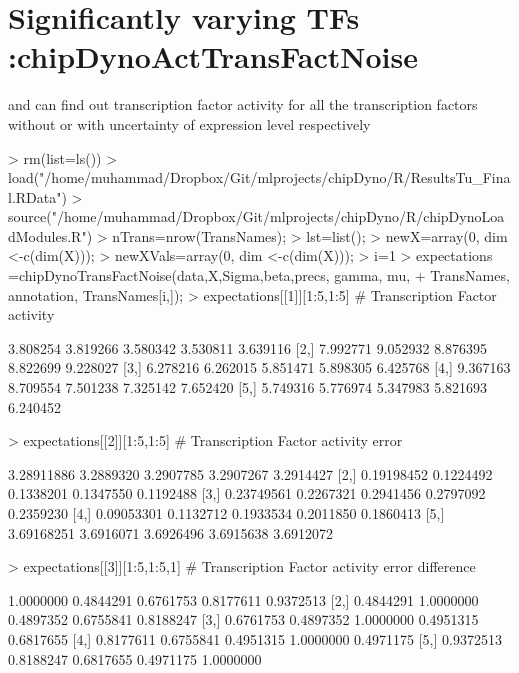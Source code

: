 \documentclass{article}
\begin{document}
\section{Significantly varying TFs :chipDynoActTransFactNoise}
 and  can find out transcription factor activity for all the transcription factors without or with uncertainty of expression level respectively 



\begin{Schunk}
\begin{Sinput}
> rm(list=ls())
> load("/home/muhammad/Dropbox/Git/mlprojects/chipDyno/R/ResultsTu_Final.RData")
> source("/home/muhammad/Dropbox/Git/mlprojects/chipDyno/R/chipDynoLoadModules.R")
> nTrans=nrow(TransNames);
> lst=list();
> newX=array(0, dim <-c(dim(X)));
> newXVals=array(0, dim <-c(dim(X)));
> i=1
> expectations =chipDynoTransFactNoise(data,X,Sigma,beta,precs, gamma, mu, 
+   					TransNames, annotation, TransNames[i,]);
> expectations[[1]][1:5,1:5] # Transcription Factor activity
\end{Sinput}
\begin{Soutput}
         [,1]     [,2]     [,3]     [,4]     [,5]
[1,] 3.808254 3.819266 3.580342 3.530811 3.639116
[2,] 7.992771 9.052932 8.876395 8.822699 9.228027
[3,] 6.278216 6.262015 5.851471 5.898305 6.425768
[4,] 9.367163 8.709554 7.501238 7.325142 7.652420
[5,] 5.749316 5.776974 5.347983 5.821693 6.240452
\end{Soutput}
\begin{Sinput}
> expectations[[2]][1:5,1:5] # Transcription Factor activity error
\end{Sinput}
\begin{Soutput}
           [,1]      [,2]      [,3]      [,4]      [,5]
[1,] 3.28911886 3.2889320 3.2907785 3.2907267 3.2914427
[2,] 0.19198452 0.1224492 0.1338201 0.1347550 0.1192488
[3,] 0.23749561 0.2267321 0.2941456 0.2797092 0.2359230
[4,] 0.09053301 0.1132712 0.1933534 0.2011850 0.1860413
[5,] 3.69168251 3.6916071 3.6926496 3.6915638 3.6912072
\end{Soutput}
\begin{Sinput}
> expectations[[3]][1:5,1:5,1] # Transcription Factor activity error difference
\end{Sinput}
\begin{Soutput}
          [,1]      [,2]      [,3]      [,4]      [,5]
[1,] 1.0000000 0.4844291 0.6761753 0.8177611 0.9372513
[2,] 0.4844291 1.0000000 0.4897352 0.6755841 0.8188247
[3,] 0.6761753 0.4897352 1.0000000 0.4951315 0.6817655
[4,] 0.8177611 0.6755841 0.4951315 1.0000000 0.4971175
[5,] 0.9372513 0.8188247 0.6817655 0.4971175 1.0000000
\end{Soutput}
\end{Schunk}
\end{document}
